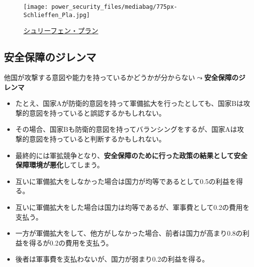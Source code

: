 \documentclass[
  xelatex,
  ja=standard]{bxjsarticle}
\providecommand{\tightlist}{%
  \setlength{\itemsep}{0pt}\setlength{\parskip}{0pt}}\usepackage{longtable,booktabs,array}
\begin{document}
\begin{figure}[htpb]

{\centering \texttt{[image: power\_security\_files/mediabag/775px-Schlieffen\_Pla.jpg]}

}

\caption{\href{https://commons.wikimedia.org/wiki/File:Schlieffen_Plan.jpg}{シュリーフェン・プラン}}

\end{figure}

\hypertarget{ux5b89ux5168ux4fddux969cux306eux30b8ux30ecux30f3ux30de}{%
\subsection{安全保障のジレンマ}\label{ux5b89ux5168ux4fddux969cux306eux30b8ux30ecux30f3ux30de}}

他国が攻撃する意図や能力を持っているかどうかが分からない\(\leadsto\)\textbf{安全保障のジレンマ}\citep{jervis1978}

\begin{itemize}
\tightlist
\item
  たとえ、国家Aが防衛的意図を持って軍備拡大を行ったとしても、国家Bは攻撃的意図を持っていると誤認するかもしれない。
\item
  その場合、国家Bも防衛的意図を持ってバランシングをするが、国家Aは攻撃的意図を持っていると判断するかもしれない。
\item
  最終的には軍拡競争となり、\textbf{安全保障のために行った政策の結果として安全保障環境が悪化}してしまう。
\end{itemize}

\begin{tcolorbox}[enhanced jigsaw, opacityback=0, leftrule=.75mm, toptitle=1mm, colframe=quarto-callout-tip-color-frame, arc=.35mm, bottomrule=.15mm, coltitle=black, bottomtitle=1mm, colbacktitle=quarto-callout-tip-color!10!white, titlerule=0mm, breakable, title=\textcolor{quarto-callout-tip-color}{\faLightbulb}\hspace{0.5em}{安全保障のジレンマ}, left=2mm, rightrule=.15mm, toprule=.15mm, opacitybacktitle=0.6, colback=white]

\begin{itemize}
\tightlist
\item
  互いに軍備拡大をしなかった場合は国力が均等であるとして0.5の利益を得る。
\item
  互いに軍備拡大をした場合は国力は均等であるが、軍事費として0.2の費用を支払う。
\item
  一方が軍備拡大をして、他方がしなかった場合、前者は国力が高まり0.8の利益を得るが0.2の費用を支払う。
\item
  後者は軍事費を支払わないが、国力が弱まり0.2の利益を得る。
\end{itemize}

\end{tcolorbox}
\end{document}
